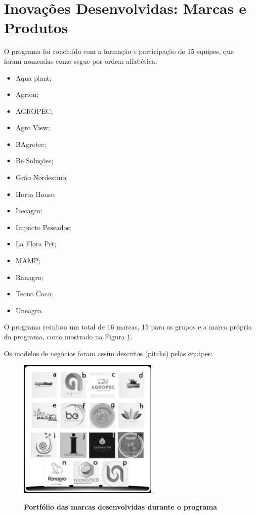 \section{Inovações Desenvolvidas: Marcas e Produtos}
\label{inovacoes}

O programa foi concluído  com a formação e participação de 15 equipes, que foram nomeadas como segue por ordem alfabética: 

\begin{multicols}{3}
\centering
    \begin{itemize}
\item { Aqua plant;}
\item { Agrion;}
\item { AGROPEC;}
\item { Agro View;}
\item { BAgrotec;}
\item { Be Soluções;}
\item { Grão Nordestino;}
\item { Horta House;}
\item { Itecagro;}
\item { Impacto Pescados;}
\item { La Flora Pet;}
\item { MAMP;}
\item { Ranagro;}
\item { Tecno Coco;}
\item { Uneagro.}
\end{itemize}
\end{multicols}


O programa resultou um total de 16 marcas, 15 para os grupos e a marca própria do programa, como mostrado na Figura \ref{fig_marcas}.

Os modelos de negócios foram assim descritos (pitchs) pelas equipes:
\begin{figure}[H]
\centering
\caption{\textbf{Portfólio das marcas desenvolvidas durante o programa}}
\includegraphics[scale=1]{Imagens/portfolio.png}
\label{fig_marcas}
\end{figure}


